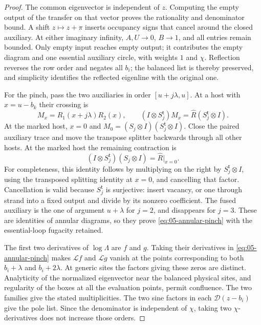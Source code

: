 \begin{proof}
The common eigenvector is independent of \(z\). Computing the empty output of the transfer on that vector proves the rationality and denominator bound. A shift \(z\mapsto z+\pi\) inserts occupancy signs that cancel around the closed auxiliary. At either imaginary infinity, \(A,U\to0\), \(B\to1\), and all entries remain bounded. Only empty input reaches empty output; it contributes the empty diagram and one essential auxiliary circle, with weights \(1\) and \(\chi\). Reflection reverses the row order and negates all \(b_i\); the balanced list is thereby preserved, and simplicity identifies the reflected eigenline with the original one.

For the pinch, pass the two auxiliaries in order \([u+j\lambda,u]\). At a host with \(x=u-b_k\) their crossing is
\[
 M_x=R_1(x+j\lambda)R_2(x),\qquad
 (I\otimes S_j^{\mathsf t})M_x
   =\widehat R(S_j^{\mathsf t}\otimes I).
\]
At the marked host, \(x=0\) and
\(M_0=(S_j\otimes I)(S_j^{\mathsf t}\otimes I)\).
Close the paired auxiliary trace and move the transpose splitter backwards through all other hosts. At the marked host the remaining contraction is
\[
 (I\otimes S_j^{\mathsf t})(S_j\otimes I)
   =\widehat R\big|_{x=0}.
\]
For completeness, this identity follows by multiplying on the right by \(S_j^{\mathsf t}\otimes I\), using the transposed splitting identity at \(x=0\), and cancelling that factor. Cancellation is valid because \(S_j^{\mathsf t}\) is surjective: insert vacancy, or one through strand into a fixed output and divide by its nonzero coefficient. The fused auxiliary is the one of argument \(u+\lambda\) for \(j=2\), and disappears for \(j=3\). These are identities of annular diagrams, so they prove \eqref{eq:05-annular-pinch} with the essential-loop fugacity retained.

The first two derivatives of \(\log\Lambda\) are \(f\) and \(g\). Taking their derivatives in \eqref{eq:05-annular-pinch} makes \(\mathscr L f\) and \(\mathscr L g\) vanish at the points corresponding to both \(b_i+\lambda\) and \(b_i+2\lambda\). At generic sites the factors giving these zeros are distinct. Analyticity of the normalized eigenvector near the balanced physical sites, and regularity of the boxes at all the evaluation points, permit confluence. The two families give the stated multiplicities. The two sine factors in each \(\mathscr D(z-b_i)\) give the pole list. Since the denominator is independent of \(\chi\), taking two \(\chi\)-derivatives does not increase those orders.
\end{proof}


